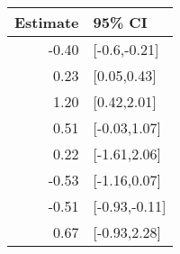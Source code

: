 \begin{tabular}{rl}
  \hline
Estimate & 95\% CI \\ 
  \hline
-0.40 & [-0.6,-0.21] \\ 
  0.23 & [0.05,0.43] \\ 
  1.20 & [0.42,2.01] \\ 
  0.51 & [-0.03,1.07] \\ 
  0.22 & [-1.61,2.06] \\ 
  -0.53 & [-1.16,0.07] \\ 
  -0.51 & [-0.93,-0.11] \\ 
  0.67 & [-0.93,2.28] \\ 
   \hline
\end{tabular}

